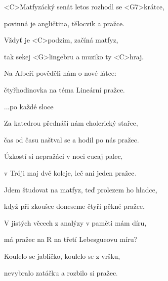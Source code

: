 

\zs
<C>Matfyzácký senát letos rozhodl se <G7>krátce,

povinná je angličtina, tělocvik a pražce.
\ks

\zr
Vždyť je <C>podzim, začíná matfyz,

tak sekej <G>lingebru a muziko ty <C>hraj.
\kr

\zs
Na Albeři pověděli nám o nové látce:

čtyřhodinovka na téma Lineární pražce.
\ks

\zr
...po každé sloce
\kr

\zs
Za katedrou přednáší nám cholerický stařec,

čas od času naštval se a hodil po nás pražec.
\ks

\zs
Úzkostí si nepražáci v noci cucaj palec,

v Tróji maj dvě koleje, leč ani jeden pražec.
\ks

\zs
Jdem študovat na matfyz, teď prolezem ho hladce,

když při zkoušce doneseme čtyři pěkné pražce.
\ks

\zs
V jistých věcech z analýzy v paměti mám díru,

má pražec na R na třetí Lebesgueovu míru?
\ks

\zs
Koulelo se jablíčko, koulelo se z vršku,

nevybralo zatáčku a rozbilo si pražec.
\ks

\kp
